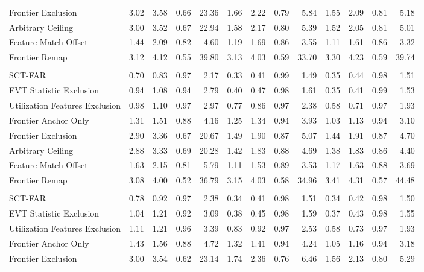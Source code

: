 \documentclass{article}
\begin{document}
\begin{table}[H]
\begin{tabularx}{\linewidth}{@{}>{\raggedright\arraybackslash}Xrrrrrrrrrrrr@{}}
Frontier Exclusion & 3.02 & 3.58 & 0.66 & 23.36 & 1.66 & 2.22 & 0.79 & 5.84 & 1.55 & 2.09 & 0.81 & 5.18 \\
Arbitrary Ceiling & 3.00 & 3.52 & 0.67 & 22.94 & 1.58 & 2.17 & 0.80 & 5.39 & 1.52 & 2.05 & 0.81 & 5.01 \\
Feature Match Offset & 1.44 & 2.09 & 0.82 & 4.60 & 1.19 & 1.69 & 0.86 & 3.55 & 1.11 & 1.61 & 0.86 & 3.32 \\
Frontier Remap & 3.12 & 4.12 & 0.55 & 39.80 & 3.13 & 4.03 & 0.59 & 33.70 & 3.30 & 4.23 & 0.59 & 39.74 \\
\addlinespace
\multicolumn{13}{@{}l}{\textbf{Random ($5$-Fold-CV)}} \\
SCT-FAR & 0.70 & 0.83 & 0.97 & 2.17 & 0.33 & 0.41 & 0.99 & 1.49 & 0.35 & 0.44 & 0.98 & 1.51 \\
EVT Statistic Exclusion & 0.94 & 1.08 & 0.94 & 2.79 & 0.40 & 0.47 & 0.98 & 1.61 & 0.35 & 0.41 & 0.99 & 1.53 \\
Utilization Features Exclusion & 0.98 & 1.10 & 0.97 & 2.97 & 0.77 & 0.86 & 0.97 & 2.38 & 0.58 & 0.71 & 0.97 & 1.93 \\
Frontier Anchor Only & 1.31 & 1.51 & 0.88 & 4.16 & 1.25 & 1.34 & 0.94 & 3.93 & 1.03 & 1.13 & 0.94 & 3.10 \\
Frontier Exclusion & 2.90 & 3.36 & 0.67 & 20.67 & 1.49 & 1.90 & 0.87 & 5.07 & 1.44 & 1.91 & 0.87 & 4.70 \\
Arbitrary Ceiling & 2.88 & 3.33 & 0.69 & 20.28 & 1.42 & 1.83 & 0.88 & 4.69 & 1.38 & 1.83 & 0.86 & 4.40 \\
Feature Match Offset & 1.63 & 2.15 & 0.81 & 5.79 & 1.11 & 1.53 & 0.89 & 3.53 & 1.17 & 1.63 & 0.88 & 3.69 \\
Frontier Remap & 3.08 & 4.00 & 0.52 & 36.79 & 3.15 & 4.03 & 0.58 & 34.96 & 3.41 & 4.31 & 0.57 & 44.48 \\
\addlinespace
\multicolumn{13}{@{}l}{\textbf{Random ($10$-Fold-CV)}} \\
SCT-FAR & 0.78 & 0.92 & 0.97 & 2.38 & 0.34 & 0.41 & 0.98 & 1.51 & 0.34 & 0.42 & 0.98 & 1.50 \\
EVT Statistic Exclusion & 1.04 & 1.21 & 0.92 & 3.09 & 0.38 & 0.45 & 0.98 & 1.59 & 0.37 & 0.43 & 0.98 & 1.55 \\
Utilization Features Exclusion & 1.11 & 1.21 & 0.96 & 3.39 & 0.83 & 0.92 & 0.97 & 2.53 & 0.58 & 0.73 & 0.97 & 1.93 \\
Frontier Anchor Only & 1.43 & 1.56 & 0.88 & 4.72 & 1.32 & 1.41 & 0.94 & 4.24 & 1.05 & 1.16 & 0.94 & 3.18 \\
Frontier Exclusion & 3.00 & 3.54 & 0.62 & 23.14 & 1.74 & 2.36 & 0.76 & 6.46 & 1.56 & 2.13 & 0.80 & 5.29 \\

\end{tabularx}
\end{table}
\end{document}
